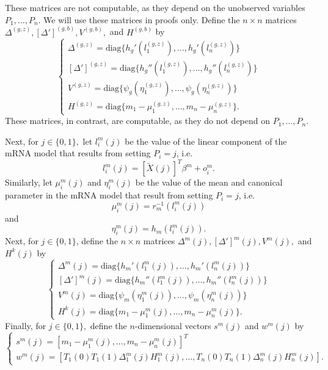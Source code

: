\documentclass[12pt]{article}
\begin{document}
These matrices are not computable, as they depend on the unobserved variables $P_1, \dots, P_n$. We will use these matrices in proofs only. Define the $n \times n$ matrices $\Delta^{(g,z)}, [\Delta']^{(g,b)}, V^{(g,b)},$ and $H^{(g,b)}$ by
$$
\begin{cases}
\Delta^{(g,z)} = \textrm{diag} \{ h_g'(l_1^{(g,z)} ), \dots, h_g'( l_n^{(g,z)}  ) \} \\
[\Delta']^{(g,z)}  = \textrm{diag} \{ h_g''(l_1^{(g,z)} ), \dots, h_g''( l_n^{(g,z)} ) \} \\
V^{(g,z)}  = \textrm{diag} \{ \psi_g( \eta^{(g,z)} _1), \dots, \psi_g( \eta^{(g,z)} _n) \} \\
H^{(g,z)}  = \textrm{diag} \{ m_1 - \mu_1^{(g,z)} , \dots, m_n - \mu_n^{(g,z)} \} .
\end{cases}
$$ These matrices, in contrast, are computable, as they do not depend on $P_1, \dots, P_n$.


Next, for $j \in \{ 0,1\},$ let $l^m_i(j)$ be the value of the linear component of the mRNA model that results from setting $P_i = j$, i.e.
$$ l_i^m(j) = [\tilde{X}(j)]^T \beta^m + o^m_i .$$ Similarly, let $\mu^m_i(j)$ and $\eta^m_i(j)$ be the value of the mean and canonical parameter in the mRNA model that result from setting $P_i = j$, i.e.
$$\mu^m_i(j) = r_m^{-1}(l_i^m(j))$$ and $$\eta^m_i(j) = h_m(l_i^m(j)).$$ Next, for $j \in \{ 0, 1\}$, define the $n \times n$ matrices $\Delta^m(j), [\Delta']^m(j), V^m(j),$ and $H^k(j)$ by
$$\begin{cases}
\Delta^m(j) = \textrm{diag} \{ h_m'(l_1^m(j)), \dots, h_m'( l_n^m(j) ) \} \\
[\Delta']^m(j) = \textrm{diag} \{ h_m''(l_1^m(j)), \dots, h_m''( l_n^m(j)) \} \\
V^m(j) = \textrm{diag} \{ \psi_m( \eta^m_1(j)), \dots, \psi_m( \eta^m_n(j)) \} \\
H^k(j) = \textrm{diag} \{ m_1 - \mu_1^m(j), \dots, m_n - \mu_n^m(j) \} .
\end{cases}
$$ Finally, for $j \in \{ 0, 1 \},$ define the $n$-dimensional vectors $s^m(j)$ and $w^m(j)$ by
$$ \begin{cases}
s^m(j) = [m_1 - \mu_1^m(j), \dots, m_n - \mu_n^m(j) ]^T \\ w^m(j) = [ T_1(0)T_1(1)\Delta^m_1(j) H^m_1(j), \dots, T_n(0)T_n(1)\Delta_n^m(j) H_n^m(j)].
\end{cases} $$
\end{document}
